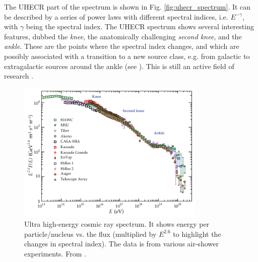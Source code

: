 \documentclass[
    a4paper, %
    fontsize=10pt, %
    twoside=false, %
    numbers=noenddot, %
    fontmethod=tex,
]{kaobook}
\begin{document}
The UHECR part of the spectrum is shown in Fig. \ref{fig:uhecr_spectrum}. It can be described by a series of power laws with different spectral indices, i.e. $E^{-\gamma}$, with $\gamma$ being the spectral index. The UHECR spectrum shows several interesting features, dubbed the \textit{knee}, the anatomically challenging \textit{second knee}, and the \textit{ankle}. These are the points where the spectral index changes, and which are possibly associated with a transition to a new source class, e.g. from galactic to extragalactic sources around the ankle (see ). This is still an active field of research \cite{Workman2022}.

\begin{figure}[htb]
    \includegraphics[width=0.8\textwidth]{theory/cr_uhecr_spectrum.pdf}
    \caption[UHECR spectrum]{Ultra high-energy cosmic ray spectrum. It shows energy per particle/nucleus vs. the flux (multiplied by $E^{2.6}$ to highlight the changes in spectral index). The data is from various air-shower experiments. From \cite{Workman2022}.}
\end{figure}
\end{document}
